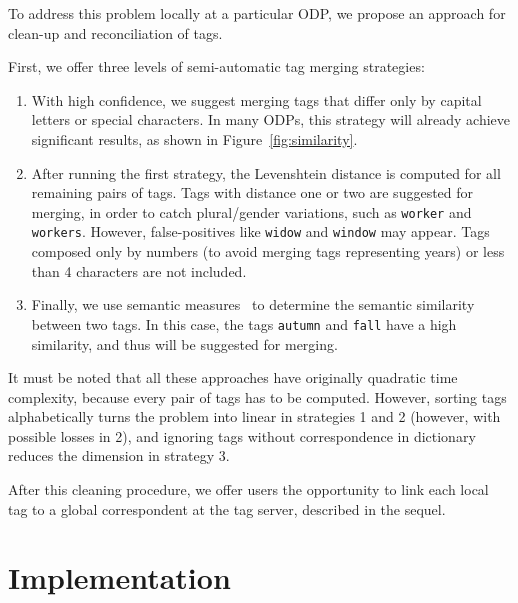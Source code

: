 To address this problem locally at a particular ODP, we propose an approach for clean-up and reconciliation of tags. %

First, we offer three levels of semi-automatic tag merging strategies:


\begin{enumerate}
	\item With high confidence, we suggest merging tags that differ only by capital letters or special characters. 
In many ODPs, this strategy will already achieve significant results, as shown in Figure~\ref{fig:similarity}.
	\item After running the first strategy, the Levenshtein distance is computed for all remaining pairs of tags.
Tags with distance one or two are suggested for merging, in order to catch plural/gender variations, such as \texttt{worker} and \texttt{workers}. 
However, false-positives like \texttt{widow} and \texttt{window} may appear.
Tags composed only by numbers (to avoid merging tags representing years) or less than 4 characters are not included.
	\item Finally, we use semantic measures~\cite{Harispe01032014} to determine the semantic similarity between two tags. 
In this case, the tags \texttt{autumn} and \texttt{fall} have a high similarity, and thus will be suggested for merging.
\end{enumerate}

It must be noted that all these approaches have originally quadratic time complexity, because every pair of tags has to be computed. However, sorting tags alphabetically turns the problem into linear in strategies 1 and 2 (however, with possible losses in 2), and ignoring tags without correspondence in dictionary reduces the dimension in strategy 3.

After this cleaning procedure, we offer users the opportunity to link each local tag to a global correspondent at the tag server, described in the sequel.




\section{Implementation}
\label{sec:implementation}

